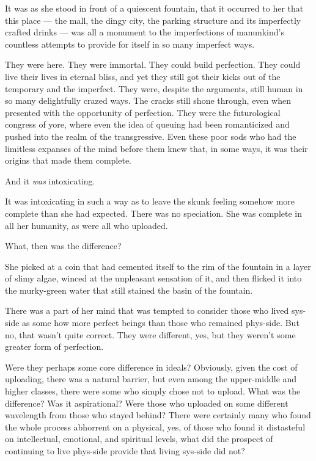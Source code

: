 It was as she stood in front of a quiescent fountain, that it occurred to her that this place — the mall, the dingy city, the parking structure and its imperfectly crafted drinks — was all a monument to the imperfections of manunkind's countless attempts to provide for itself in so many imperfect ways.

They were here. They were immortal. They could build perfection. They could live their lives in eternal bliss, and yet they still got their kicks out of the temporary and the imperfect. They were, despite the arguments, still human in so many delightfully crazed ways. The cracks still shone through, even when presented with the opportunity of perfection. They were the futurological congress of yore, where even the idea of queuing had been romanticized and pushed into the realm of the transgressive. Even these poor sods who had the limitless expanses of the mind before them knew that, in some ways, it was their origins that made them complete.

And it \emph{was} intoxicating.

It was intoxicating in such a way as to leave the skunk feeling somehow more complete than she had expected. There was no speciation. She was complete in all her humanity, as were all who uploaded.

What, then was the difference?

She picked at a coin that had cemented itself to the rim of the fountain in a layer of slimy algae, winced at the unpleasant sensation of it, and then flicked it into the murky-green water that still stained the basin of the fountain.

There was a part of her mind that was tempted to consider those who lived sys-side as some how more perfect beings than those who remained phys-side. But no, that wasn't quite correct. They were different, yes, but they weren't some greater form of perfection.

Were they perhaps some core difference in ideals? Obviously, given the cost of uploading, there was a natural barrier, but even among the upper-middle and higher classes, there were some who simply chose not to upload. What was the difference? Was it aspirational? Were those who uploaded on some different wavelength from those who stayed behind? There were certainly many who found the whole process abhorrent on a physical, yes, of those who found it distasteful on intellectual, emotional, and spiritual levels, what did the prospect of continuing to live phys-side provide that living sys-side did not?

